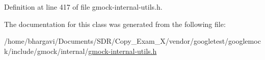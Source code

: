 Definition at line 417 of file gmock-\/internal-\/utils.\+h.



The documentation for this class was generated from the following file\+:\begin{DoxyCompactItemize}
\item 
/home/bhargavi/\+Documents/\+S\+D\+R/\+Copy\+\_\+\+Exam\+\_\+X/vendor/googletest/googlemock/include/gmock/internal/\hyperlink{gmock-internal-utils_8h}{gmock-\/internal-\/utils.\+h}\end{DoxyCompactItemize}
